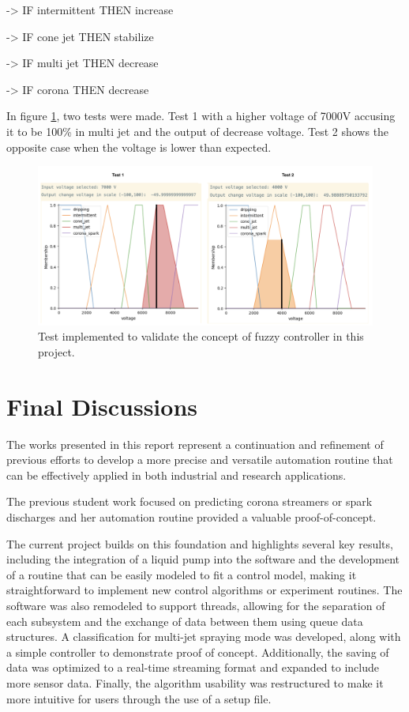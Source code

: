         -> IF intermittent THEN increase

        -> IF cone jet THEN stabilize

        -> IF multi jet THEN decrease

        -> IF corona THEN decrease


        In figure \ref{fig:fuzzyy1}, two tests were made. Test 1 with a higher voltage of 7000V accusing it to be 100\% in multi jet and the output of decrease voltage. Test 2 shows the opposite case when the voltage is lower than expected.

    \begin{figure}[H]
        \centering
        \includegraphics[width=17cm]{Figuras/fuzzy/test3.png}
        \caption{Test implemented to validate the concept of fuzzy controller in this project.}
        \label{fig:fuzzyy1}
    \end{figure}
        

    \section{Final Discussions}

        The works presented in this report represent a continuation and refinement of previous efforts to develop a more precise and versatile automation routine that can be effectively applied in both industrial and research applications. 
        
        The previous student work focused on predicting corona streamers or spark discharges\cite{Monica} and her automation routine provided a valuable proof-of-concept. 
        
        The current project builds on this foundation and highlights several key results, including the integration of a liquid pump into the software and the development of a routine that can be easily modeled to fit a control model, making it straightforward to implement new control algorithms or experiment routines. 
        The software was also remodeled to support threads, allowing for the separation of each subsystem and the exchange of data between them using queue data structures. A classification for multi-jet spraying mode was developed, along with a simple controller to demonstrate proof of concept. 
        Additionally, the saving of data was optimized to a real-time streaming format and expanded to include more sensor data. Finally, the algorithm usability was restructured to make it more intuitive for users through the use of a setup file.

        
\clearpage
